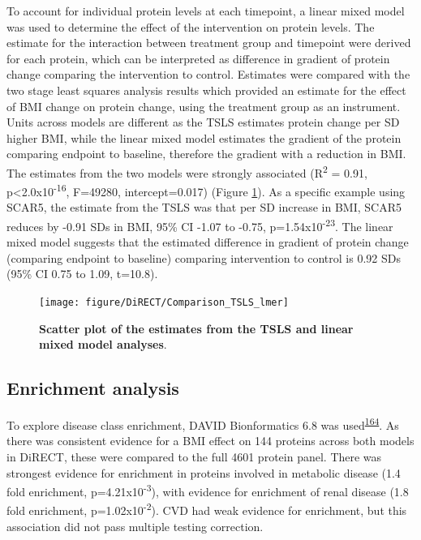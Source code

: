 \documentclass[11pt,twoside]{bristolthesis}
\begin{document}
To account for individual protein levels at each timepoint, a linear mixed model was used to determine the effect of the intervention on protein levels. The estimate for the interaction between treatment group and timepoint were derived for each protein, which can be interpreted as difference in gradient of protein change comparing the intervention to control. Estimates were compared with the two stage least squares analysis results which provided an estimate for the effect of BMI change on protein change, using the treatment group as an instrument. Units across models are different as the TSLS estimates protein change per SD higher BMI, while the linear mixed model estimates the gradient of the protein comparing endpoint to baseline, therefore the gradient with a reduction in BMI. The estimates from the two models were strongly associated (R\textsuperscript{2} = 0.91, p\textless2.0x10\textsuperscript{-16}, F=49280, intercept=0.017) (Figure \ref{fig:tsls-lmer}). As a specific example using SCAR5, the estimate from the TSLS was that per SD increase in BMI, SCAR5 reduces by -0.91 SDs in BMI, 95\% CI -1.07 to -0.75, p=1.54x10\textsuperscript{-23}. The linear mixed model suggests that the estimated difference in gradient of protein change (comparing endpoint to baseline) comparing intervention to control is 0.92 SDs (95\% CI 0.75 to 1.09, t=10.8).



\begin{figure}

{\centering \texttt{[image: figure/DiRECT/Comparison\_TSLS\_lmer]} 

}

\caption[Scatter plot of the estimates from the TSLS and linear mixed model analyses]{\textbf{Scatter plot of the estimates from the TSLS and linear mixed model analyses}.}\label{fig:tsls-lmer}
\end{figure}
\hypertarget{enrichment-analysis-1}{%
\subsection{Enrichment analysis}\label{enrichment-analysis-1}}

To explore disease class enrichment, DAVID Bionformatics 6.8 was used\textsuperscript{\protect\hyperlink{ref-Huang2009}{164}}. As there was consistent evidence for a BMI effect on 144 proteins across both models in DiRECT, these were compared to the full 4601 protein panel. There was strongest evidence for enrichment in proteins involved in metabolic disease (1.4 fold enrichment, p=4.21x10\textsuperscript{-3}), with evidence for enrichment of renal disease (1.8 fold enrichment, p=1.02x10\textsuperscript{-2}). CVD had weak evidence for enrichment, but this association did not pass multiple testing correction.
\end{document}
